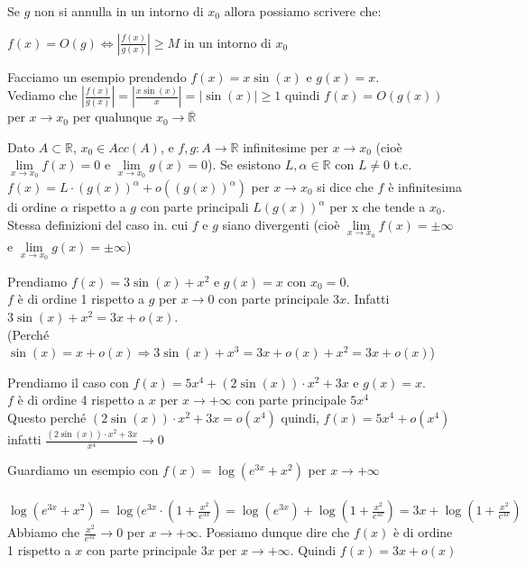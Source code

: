 \begin{observation}
Se $g$ non si annulla in un intorno di $x_0$ allora possiamo scrivere che:
    \begin{center}
        $f(x) = O(g) \Longleftrightarrow |\frac{f(x)}{g(x)}| \geq M$ in un intorno di $x_0$
    \end{center}
\end{observation}

\begin{example}
    Facciamo un esempio prendendo $f(x) = x\sin(x)$ e $g(x) = x$.\\
    Vediamo che $|\frac{f(x)}{g(x)}| = |\frac{x\sin(x)}{x}| = |\sin(x)| \geq 1$ quindi $f(x) = O(g(x))$ per $x\to x_0$ per qualunque $x_0 \to \overline{\mathbb{R}}$
\end{example}

\begin{definition}
    Dato $A \subset \mathbb{R}$, $x_0 \in Acc(A)$, e $f,g: A \to \mathbb{R}$ infinitesime per $x\to x_0$ (cioè $\lim\limits_{x\to x_0}f(x) = 0$ e $\lim\limits_{x\to x_0}g(x) = 0$). Se esistono $L, \alpha \in \mathbb{R}$ con $L \neq 0$ t.c. $f(x) = L \cdot (g(x))^\alpha + o((g(x))^\alpha)$ per $x\to x_0$ si dice che $f$ è infinitesima di ordine $\alpha$ rispetto a $g$ con parte principali $L(g(x))^\alpha$ per x che tende a $x_0$.\\
    Stessa definizioni del caso in. cui $f$ e $g$ siano divergenti (cioè $\lim\limits_{x\to x_0}f(x) = \pm\infty$ e $\lim\limits_{x\to x_0}g(x) = \pm\infty$)
\end{definition}

\begin{example}
    Prendiamo $f(x) = 3\sin(x) + x^2$ e $g(x) = x$ con $x_0 = 0$.\\
    $f$ è di ordine 1 rispetto a $g$ per $x\to 0$ con parte principale $3x$. Infatti $3\sin(x) + x^2 = 3x + o(x)$.\\
    (Perché $\sin(x) = x + o(x) \Longrightarrow 3\sin(x) + x^3 = 3x + o(x) + x^2 = 3x + o(x)$)
\end{example}

\begin{example}
    Prendiamo il caso con $f(x) = 5x^4 + (2\sin(x)) \cdot x^2 + 3x$ e $g(x) = x$.\\
    $f$ è di ordine 4 rispetto a $x$ per $x\to +\infty$ con parte principale $5x^4$\\
    Questo perché $(2\sin(x)) \cdot x^2 + 3x = o(x^4)$ quindi, $f(x) = 5x^4 + o(x^4)$ infatti $\frac{(2\sin(x)) \cdot x^2 + 3x}{x^4} \to 0$
\end{example}

\begin{example}
    Guardiamo un esempio con $f(x) = \log(e^{3x} + x^2)$ per $x\to +\infty$\\\\
    $\log(e^{3x} + x^2) = \log(e^{3x} \cdot (1 + \frac{x^2}{e^{3x}}) = \log(e^{3x}) + \log(1 + \frac{x^2}{e^{3x}}) = 3x + \log(1 + \frac{x^2}{e^{3x}})$\\
    Abbiamo che $\frac{x^2}{e^{3x}}\to 0$ per $x\to +\infty$. Possiamo dunque dire che $f(x)$ è di ordine 1 rispetto a $x$ con parte principale $3x$ per $x\to +\infty$. Quindi $f(x) = 3x + o(x)$
\end{example}